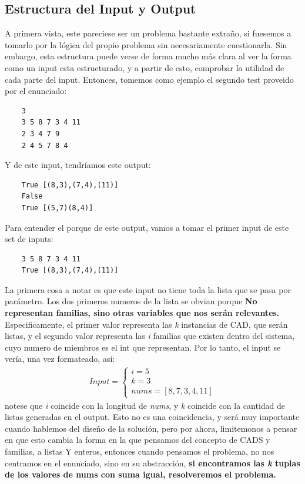 \documentclass[a4paper]{article}
\begin{document}
\subsection{Estructura del Input y Output}
A primera vista, este pareciese ser un problema bastante extraño, si fuesemos a tomarlo por la lógica
del propio problema sin necesariamente cuestionarla. Sin embargo, esta estructura puede verse de forma mucho
más clara al ver la forma como un input esta estructurado, y a partir de esto, comprobar la
utilidad de cada parte del input. Entonces, tomemos como ejemplo el segundo test proveido por el
enunciado:
\begin{verbatim}
    3 
    3 5 8 7 3 4 11
    2 3 4 7 9 
    2 4 5 7 8 4
\end{verbatim}
Y de este input, tendríamos este output:
\begin{verbatim}
    True [(8,3),(7,4),(11)]
    False
    True [(5,7)(8,4)]
\end{verbatim}
Para entender el porque de este output, vamos a tomar el primer input de este
set de inputs:
\begin{verbatim}
    3 5 8 7 3 4 11
    True [(8,3),(7,4),(11)]
\end{verbatim}
La primera cosa a notar es que este input no tiene toda la lista que se pasa por
parámetro. Los dos primeros numeros de la lista se obvian porque \textbf{No representan
familias, sino otras variables que nos serán relevantes.} Especificamente, el primer valor
representa las \textit{k} instancias de CAD, que serán listas, y el segundo valor representa
las \textit{i} familias que existen dentro del sistema, cuyo numero de miembros es
el int que representan. Por lo tanto, el input se vería, una vez formateado, así:
\begin{align*}
    Input = \begin{cases}
        i = 5 \\
        k = 3 \\
        nums = [8, 7, 3, 4, 11]
    \end{cases}
\end{align*}
notese que \textit{i} coincide con la longitud de \textit{nums}, y \textit{k} coincide
con la cantidad de listas generadas en el output. Esto no es una coincidencia, y será muy
importante cuando hablemos del diseño de la solución, pero por ahora, limitemonos a pensar
en que esto cambia la forma en la que pensamos del concepto de CADS y familias, a listas Y
enteros, entonces cuando pensamos el problema, no nos centramos en el enunciado, sino en su 
abstracción, \textbf{si encontramos las \textit{k} tuplas de los valores de nums con suma igual,
resolveremos el problema.}
\end{document}
